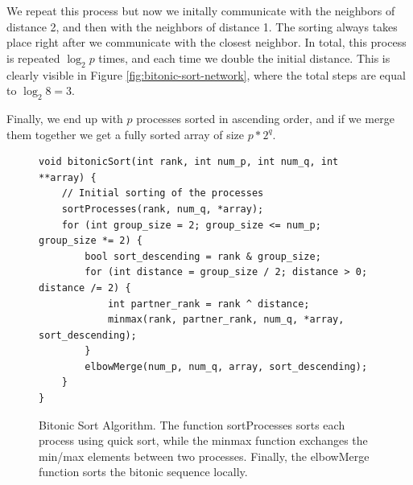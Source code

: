 \documentclass{article}
\begin{document}
We repeat this process but now we initally communicate with the neighbors of distance 2, and then with 
the neighbors of distance 1. The sorting always takes place right after we communicate with the closest neighbor.
In total, this process is repeated $\log_2{p}$ times, and each time we double the initial distance. 
This is clearly visible in Figure \ref{fig:bitonic-sort-network}, where the total steps are equal to $\log_2{8} = 3$.

Finally, we end up with $p$ processes sorted in ascending order, and if we merge them together we get a fully
sorted array of size $p * 2^q$.

\begin{figure}[H]
\begin{verbatim}
void bitonicSort(int rank, int num_p, int num_q, int **array) {
    // Initial sorting of the processes
    sortProcesses(rank, num_q, *array);
    for (int group_size = 2; group_size <= num_p; group_size *= 2) {
        bool sort_descending = rank & group_size;
        for (int distance = group_size / 2; distance > 0; distance /= 2) {
            int partner_rank = rank ^ distance;
            minmax(rank, partner_rank, num_q, *array, sort_descending);
        }
        elbowMerge(num_p, num_q, array, sort_descending);
    }
}
\end{verbatim}
\caption{Bitonic Sort Algorithm. The function sortProcesses sorts each process using quick sort, while the
minmax function exchanges the min/max elements between two processes. Finally, the elbowMerge function sorts
the bitonic sequence locally.}
\label{alg:bitonic-sort}
\end{figure}
\end{document}
